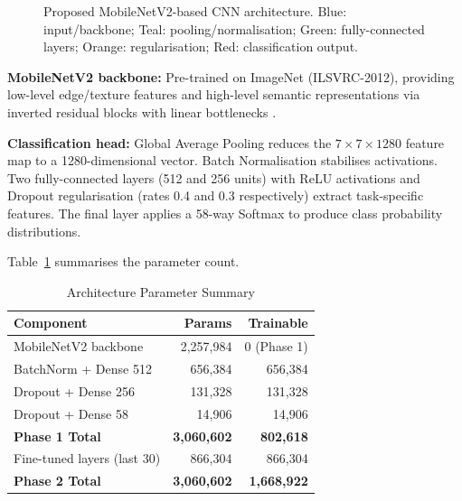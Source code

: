 \documentclass[journal,10pt,twocolumn]{IEEEtran}
\begin{document}
\begin{figure}[H]
\centering
{}
\caption{Proposed MobileNetV2-based CNN architecture. Blue: input/backbone;
Teal: pooling/normalisation; Green: fully-connected layers;
Orange: regularisation; Red: classification output.}
\label{fig:arch}
\end{figure}

\textbf{MobileNetV2 backbone:} Pre-trained on ImageNet (ILSVRC-2012), providing
low-level edge/texture features and high-level semantic representations via
inverted residual blocks with linear bottlenecks \cite{sandler2018mobilenetv2}.

\textbf{Classification head:} Global Average Pooling reduces the $7\times7\times1280$
feature map to a 1280-dimensional vector. Batch Normalisation stabilises
activations. Two fully-connected layers (512 and 256 units) with ReLU
activations and Dropout regularisation (rates 0.4 and 0.3 respectively) extract
task-specific features. The final layer applies a 58-way Softmax to produce
class probability distributions.

Table~\ref{tab:arch} summarises the parameter count.

\begin{table}[H]
\centering
\caption{Architecture Parameter Summary}
\label{tab:arch}
\begin{tabular}{lrr}
\toprule
\textbf{Component} & \textbf{Params} & \textbf{Trainable} \\
\midrule
MobileNetV2 backbone & 2,257,984 & 0 (Phase 1) \\
BatchNorm + Dense 512 & 656,384 & 656,384 \\
Dropout + Dense 256  & 131,328 & 131,328 \\
Dropout + Dense 58   & 14,906  & 14,906  \\
\midrule
\textbf{Phase 1 Total} & \textbf{3,060,602} & \textbf{802,618} \\
\midrule
Fine-tuned layers (last 30) & 866,304 & 866,304 \\
\textbf{Phase 2 Total} & \textbf{3,060,602} & \textbf{1,668,922} \\
\bottomrule
\end{tabular}
\end{table}
\end{document}

